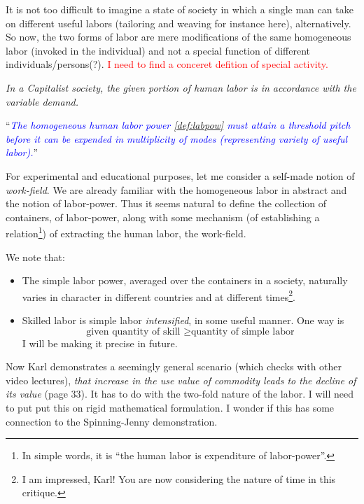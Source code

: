 \documentclass[12pt]{extarticle}
\theoremstyle{definition}
\newenvironment{remark}[1][Remark]{\begin{trivlist}
\item[\hskip \labelsep {\bfseries #1}]}{\end{trivlist}}
\begin{document}
It is not too difficult to imagine a state of society in which a single man can take on different useful labors (tailoring and weaving for instance here), alternatively.  So now, the two forms of labor are mere modifications of the same homogeneous labor (invoked in the individual) and not a special function of different individuals/persons(?).  \textcolor{red}{I need to find a conceret defition of special activity.}

\emph{In a Capitalist society, the given portion of human labor is in accordance with the variable demand.}

``\emph{\textcolor{blue}{The homogeneous human labor power \ref{def:labpow} must attain a threshold pitch before it can be expended in multiplicity of modes (representing variety of useful labor).}}''

For experimental and educational purposes, let me consider a self-made notion of \emph{work-field}.  We are already familiar with the homogeneous labor in abstract and the notion of labor-power.  Thus it seems natural to define the collection of containers, of labor-power, along with some mechanism (of establishing a relation\footnote{In simple words, it is ``the human labor is expenditure of labor-power''.}) of extracting the human labor, the work-field.
\begin{remark}
  We note that:
  \begin{itemize}
  \item The simple labor power, averaged over the containers in a society, naturally varies in character in different countries and at different times\footnote{I am impressed, Karl!  You are now considering the nature of time in this critique.}.
  \item Skilled labor is simple labor \emph{intensified}, in some useful manner.  One way is
    \begin{equation}
      \text{given quantity of skill } \geq \text{quantity of simple labor}
    \end{equation}
    I will be making it precise in future.
  \end{itemize}
\end{remark}

Now Karl demonstrates a seemingly general scenario (which checks with other video lectures), \emph{that increase in the use value of commodity leads to the decline of its value} (page 33).  It has to do with the two-fold nature of the labor.  I will need to put put this on rigid mathematical formulation.  I wonder if this has some connection to the Spinning-Jenny demonstration.
\end{document}
